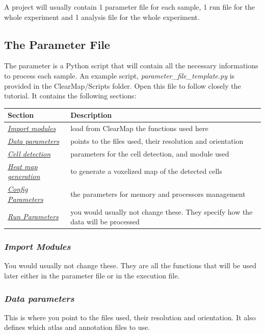 \documentclass[letterpaper,10pt,english]{sphinxmanual}
\begin{document}
A project will usually contain 1 parameter file for each sample, 1 run file for the whole experiment and 1 analysis file for the whole experiment.


\subsection{The Parameter File}
\label{tutorial:the-parameter-file}
The parameter is a Python script that will contain all the necessary informations to process each sample. An example script, \emph{parameter\_file\_template.py} is provided in the ClearMap/Scripts folder. Open this file to follow closely the tutorial. It contains the following sections:

\begin{tabulary}{\linewidth}{|L|L|}
\hline
\textsf{\relax 
Section
} & \textsf{\relax 
Description
}\\
\hline
{\hyperref[tutorial:import-modules]{\emph{Import modules}}}
 & 
load from ClearMap the functions used here
\\
\hline
{\hyperref[tutorial:data-parameters]{\emph{Data parameters}}}
 & 
points to the files used, their resolution and orientation
\\
\hline
{\hyperref[tutorial:cell-detection]{\emph{Cell detection}}}
 & 
parameters for the cell detection, and module used
\\
\hline
{\hyperref[tutorial:heat-map-generation]{\emph{Heat map generation}}}
 & 
to generate a voxelized map of the detected cells
\\
\hline
{\hyperref[tutorial:config-parameters]{\emph{Config Parameters}}}
 & 
the parameters for memory and processors management
\\
\hline
{\hyperref[tutorial:run-parameters]{\emph{Run Parameters}}}
 & 
you would usually not change these. They specify how the data will be processed
\\
\hline\end{tabulary}



\subsubsection{\emph{Import Modules}}
\label{tutorial:import-modules}
You would usually not change these. They are all the functions that will be used later either in the parameter file or in the  execution file.


\subsubsection{\emph{Data parameters}}
\label{tutorial:data-parameters}
This is where you point to the files used, their resolution and orientation. It also defines which atlas and annotation files to use.
\end{document}
